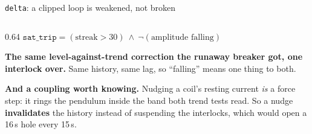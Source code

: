 \documentclass[aspectratio=169]{beamer}
\begin{document}
\begin{frame}{\texttt{delta}: a clipped loop is weakened, not broken}
\begin{columns}[T]
\begin{column}{0.64\textwidth}
      \vspace{2mm}
      \centering
      {\scriptsize $\texttt{sat\_trip} = (\text{streak} > 30)
         \ \wedge\ \neg(\text{amplitude falling})$}

      \vspace{2mm}
      \raggedright
      \textbf{The same level-against-trend correction the runaway breaker got,
      one interlock over.} Same history, same lag, so ``falling'' means one
      thing to both.

      \vspace{2mm}
      \textbf{And a coupling worth knowing.} Nudging a coil's resting current
      \emph{is} a force step: it rings the pendulum inside the band both trend
      tests read. So a nudge \textbf{invalidates} the history instead of
      suspending the interlocks, which would open a 16\,s hole every 15\,s.
    \end{column}
  \end{columns}
\end{frame}
\end{document}
